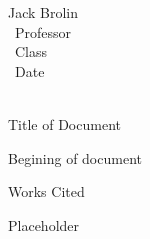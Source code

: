 \documentclass[12pt]{article}
\newcommand{\bibent}{\noindent \hangindent 40pt}
\newenvironment{workscited}{\newpage \begin{center} Works Cited \end{center}}{\newpage }
\begin{document}
\begin{flushleft}
Jack Brolin \\\
Professor \\\
Class \\\
Date \\\


\begin{center}
	Title of Document
\end{center}

\setlength{\parindent}{0.5in}

Begining of document

\begin{workscited}
	\bibent 
	Placeholder
\end{workscited}
\end{flushleft}
\end{document}
